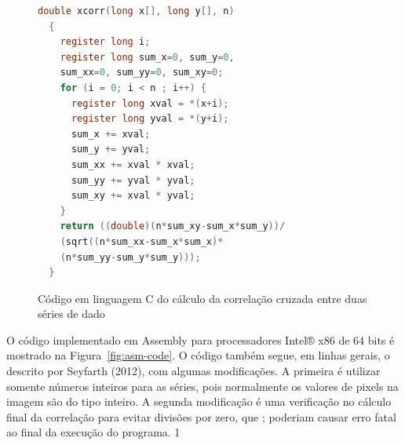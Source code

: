 \documentclass[a4paper]{article}
\begin{document}
\begin{figure}[h]
  \centering

\begin{lstlisting}[language=C]
  double xcorr(long x[], long y[], n)
  {
    register long i;
    register long sum_x=0, sum_y=0, 
    sum_xx=0, sum_yy=0, sum_xy=0;
    for (i = 0; i < n ; i++) {
      register long xval = *(x+i);
      register long yval = *(y+i);
      sum_x += xval;
      sum_y += yval;
      sum_xx += xval * xval;
      sum_yy += yval * yval;
      sum_xy += xval * yval;
    }
    return ((double)(n*sum_xy-sum_x*sum_y))/
    (sqrt((n*sum_xx-sum_x*sum_x)* 
    (n*sum_yy-sum_y*sum_y)));
  }
\end{lstlisting}
  \caption{Código em linguagem C do cálculo da correlação cruzada entre duas séries de dado}
  \label{fig:c-code}
\end{figure}

O código implementado em Assembly para processadores Intel® x86 de 64
bits é mostrado na Figura~\ref{fig:asm-code}. O código também segue, em linhas gerais,
o descrito por Seyfarth (2012), com algumas modificações. A primeira é
utilizar somente números inteiros para as séries, pois normalmente os
valores de pixels na imagem são do tipo inteiro. A segunda modificação
é uma verificação no cálculo final da correlação para evitar divisões
por zero, que ; poderiam causar erro fatal ao final da execução do
programa.  1
\end{document}

